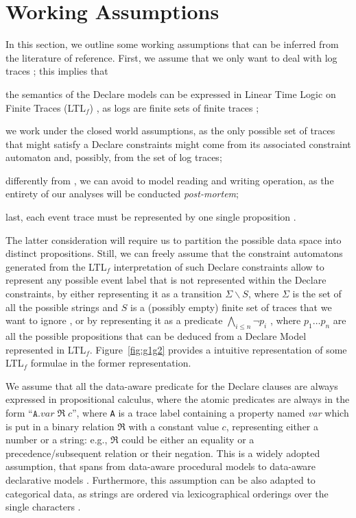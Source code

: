 \section{Working Assumptions}\label{sec:wa}
In this section, we outline some working assumptions that can be inferred from the literature of reference. First, we assume that we only want to deal with log traces \cite{XuLZ17a}; this implies that \begin{enumerate*}[label=\emph{\alph*})] \item the semantics of the Declare models can be expressed in Linear Time Logic on Finite Traces (LTL$_f$) \cite{10.1007/978-3-642-40176-3_8}, as logs are finite sets of finite traces \cite{GiacomoV13}; \item we work under the closed world assumptions, as the only possible set of traces that might satisfy a Declare constraints might come from its associated constraint automaton and, possibly, from the set of log traces; \item differently from \cite{MultiPerspective}, we can avoid to model reading and writing operation, as the entirety of our analyses will be conducted \textit{post-mortem}; \item last, each event trace must be represented by one single proposition \cite{XuLZ17a}. \end{enumerate*} The latter consideration will require us to partition the possible data space into distinct propositions. Still, we can freely assume that the constraint automatons generated from the LTL$_f$ interpretation of such Declare constraints allow to represent any possible event label that is not represented within the Declare constraints, by either representing it as a transition $\Sigma\backslash S$, where $\Sigma$ is the set of all the possible strings and $S$ is a (possibly empty) finite set of traces that we want to ignore \cite{LeoniMA12,Westergaard11}, or by representing it as a predicate $\bigwedge_{i\leq n} \neg p_i$ \cite{Lydia}, where $p_1\dots p_n$ are all the possible propositions that can be deduced from a Declare Model represented in LTL$_f$. Figure~\ref{fig:g1g2} provides a intuitive representation of some LTL$_f$ formulae in the former representation.

We assume that all the data-aware predicate for the Declare clauses are always expressed in propositional calculus, where the atomic predicates are always in the form ``$\texttt{A}.\textit{var}\;\Re\; c$'', where \texttt{A} is a trace label containing a property named \textit{var} which is put in a binary relation $\Re$ with a constant value $c$, representing either a number or a string: e.g., $\Re$ could be either an equality or a precedence/subsequent relation or their negation. This is a widely adopted assumption, that spans from data-aware procedural models \cite{MultiPerspective} to data-aware declarative models \cite{10.1007/978-3-642-40176-3_8}. Furthermore, this assumption can be also adapted to categorical data, as strings are ordered via lexicographical orderings over the single characters \cite{MultiPerspective}.

